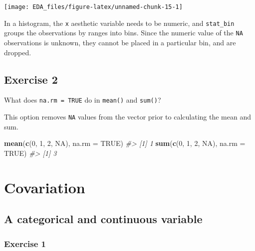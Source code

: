 \documentclass[]{book}
\newenvironment{Shaded}{\begin{snugshade}}{\end{snugshade}}
\newcommand{\CommentTok}[1]{\textcolor[rgb]{0.56,0.35,0.01}{\textit{#1}}}
\newcommand{\DataTypeTok}[1]{\textcolor[rgb]{0.13,0.29,0.53}{#1}}
\newcommand{\DecValTok}[1]{\textcolor[rgb]{0.00,0.00,0.81}{#1}}
\newcommand{\KeywordTok}[1]{\textcolor[rgb]{0.13,0.29,0.53}{\textbf{#1}}}
\newcommand{\NormalTok}[1]{#1}
\newcommand{\OtherTok}[1]{\textcolor[rgb]{0.56,0.35,0.01}{#1}}
\theoremstyle{plain}
\theoremstyle{remark}
\theoremstyle{definition}
\theoremstyle{definition}
\theoremstyle{definition}
\theoremstyle{remark}
\begin{document}
\begin{center}\texttt{[image: EDA\_files/figure-latex/unnamed-chunk-15-1]} \end{center}

In a histogram, the \texttt{x} aesthetic variable needs to be numeric,
and \texttt{stat\_bin} groups the observations by ranges into bins.
Since the numeric value of the \texttt{NA} observations is unknown, they
cannot be placed in a particular bin, and are dropped.

\hypertarget{exercise-2-13}{%
\subsection{Exercise 2}\label{exercise-2-13}}

What does \texttt{na.rm\ =\ TRUE} do in \texttt{mean()} and
\texttt{sum()}?

This option removes \texttt{NA} values from the vector prior to
calculating the mean and sum.

\begin{Shaded}
\begin{Highlighting}[]
\KeywordTok{mean}\NormalTok{(}\KeywordTok{c}\NormalTok{(}\DecValTok{0}\NormalTok{, }\DecValTok{1}\NormalTok{, }\DecValTok{2}\NormalTok{, }\OtherTok{NA}\NormalTok{), }\DataTypeTok{na.rm =} \OtherTok{TRUE}\NormalTok{)}
\CommentTok{#> [1] 1}
\KeywordTok{sum}\NormalTok{(}\KeywordTok{c}\NormalTok{(}\DecValTok{0}\NormalTok{, }\DecValTok{1}\NormalTok{, }\DecValTok{2}\NormalTok{, }\OtherTok{NA}\NormalTok{), }\DataTypeTok{na.rm =} \OtherTok{TRUE}\NormalTok{)}
\CommentTok{#> [1] 3}
\end{Highlighting}
\end{Shaded}

\hypertarget{covariation}{%
\section{Covariation}\label{covariation}}

\hypertarget{a-categorical-and-continuous-variable}{%
\subsection{A categorical and continuous
variable}\label{a-categorical-and-continuous-variable}}

\hypertarget{exercise-1-15}{%
\subsubsection{Exercise 1}\label{exercise-1-15}}
\end{document}
